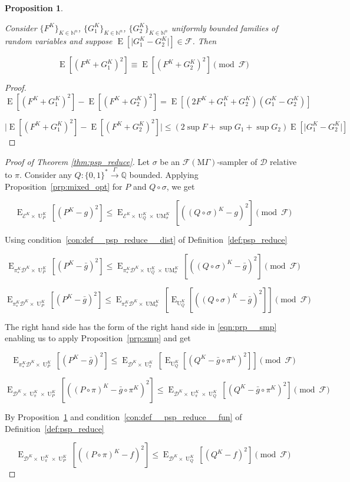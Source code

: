 \documentclass[11pt]{article}
\numberwithin{equation}{section}
\theoremstyle{definition}
\theoremstyle{plain}
\newtheorem{proposition}{Proposition}[section]
\newcommand{\Bool}{\{0,1\}}
\newcommand{\Words}{{\Bool^*}}
\DeclareMathOperator{\E}{E}
\DeclareMathOperator{\UM}{UM}
\DeclareMathOperator{\Un}{U}
\newcommand{\Nats}{\mathbb{N}}
\newcommand{\Rats}{\mathbb{Q}}
\newcommand{\Abs}[1]{\lvert #1 \rvert}
\newcommand{\Dist}{\mathcal{D}}
\newcommand{\MGrow}{\mathrm{M}\Gamma}
\newcommand{\Fall}{\mathcal{F}}
\newcommand{\EMG}{\Fall(\MGrow)}
\newcommand{\Scheme}{\xrightarrow{\Gamma}}
\begin{document}
\begin{samepage}
\begin{proposition}
\label{prp:sq_diff_cong}

Consider $\{F^K\}_{K \in \Nats^n}$, $\{G_1^K\}_{K \in \Nats^n}$, $\{G_2^K\}_{K \in \Nats^n}$ uniformly bounded families of random variables and suppose ${\E[\Abs{G_1^K - G_2^K}] \in \Fall}$. Then

\begin{equation}
\E[(F^K + G_1^K)^2] \equiv \E[(F^K + G_2^K)^2] \pmod \Fall
\end{equation}

\end{proposition}
\end{samepage}

\begin{proof}

\[\E[(F^K + G_1^K)^2] - \E[(F^K + G_2^K)^2] = \E[(2 F^K + G_1^K + G_2^K)(G_1^K - G_2^K)]\]

\[\Abs{\E[(F^K + G_1^K)^2] - \E[(F^K + G_2^K)^2]} \leq (2 \sup F + \sup G_1 + \sup G_2) \E[\Abs{G_1^K - G_2^K}]\]
%
\end{proof}

\begin{proof}[Proof of Theorem \ref{thm:psp_reduce}]

Let ${\sigma}$ be an ${\EMG}$-sampler of ${\Dist}$ relative to ${\pi}$. Consider any ${Q: \Words \Scheme \Rats}$ bounded. Applying Proposition~\ref{prp:mixed_opt} for ${P}$ and ${Q \circ \sigma}$, we get

\[\E_{\mathcal{E}^{K} \times \Un_P^K}[(P^K-g)^2] \leq \E_{\mathcal{E}^{K} \times \Un_Q^K \times \UM_\sigma^K}[((Q \circ \sigma)^K - g)^2] \pmod \Fall\]

Using condition~\ref{con:def__psp_reduce__dist} of Definition~\ref{def:psp_reduce}

\[\E_{\pi_*^K\Dist^{K} \times \Un_P^K}[(P^K-\bar{g})^2] \leq \E_{\pi_*^K\Dist^{K} \times \Un_Q^K \times \UM_\sigma^K}[((Q \circ \sigma)^K - \bar{g})^2] \pmod \Fall\]

\[\E_{\pi_*^K\Dist^{K} \times \Un_P^K}[(P^K-\bar{g})^2] \leq \E_{\pi_*^K\Dist^{K} \times \UM_\sigma^K}[\E_{\Un_Q^K}[((Q \circ \sigma)^K - \bar{g})^2]] \pmod \Fall\]

The right hand side has the form of the right hand side in \ref{eqn:prp__smp} enabling us to apply Proposition~\ref{prp:smp} and get

\[\E_{\pi_*^K\Dist^{K} \times \Un_P^K}[(P^K-\bar{g})^2] \leq \E_{\Dist^{K} \times \Un_\pi^K}[\E_{\Un_Q^K}[(Q^K - \bar{g} \circ \pi^K)^2]] \pmod \Fall\]

\[\E_{\Dist^{K} \times \Un_\pi^K \times \Un_P^K}[((P \circ \pi)^K-\bar{g} \circ \pi^K)^2] \leq \E_{\Dist^{K} \times \Un_\pi^K \times \Un_Q^K}[(Q^K - \bar{g} \circ \pi^K)^2] \pmod \Fall\]

By Proposition~\ref{prp:sq_diff_cong} and condition~\ref{con:def__psp_reduce__fun} of Definition~\ref{def:psp_reduce}

\[\E_{\Dist^{K} \times \Un_\pi^K \times \Un_P^K}[((P \circ \pi)^K-f)^2] \leq \E_{\Dist^{K} \times \Un_Q^K}[(Q^K - f)^2] \pmod \Fall\]
%
\end{proof}
\end{document}
